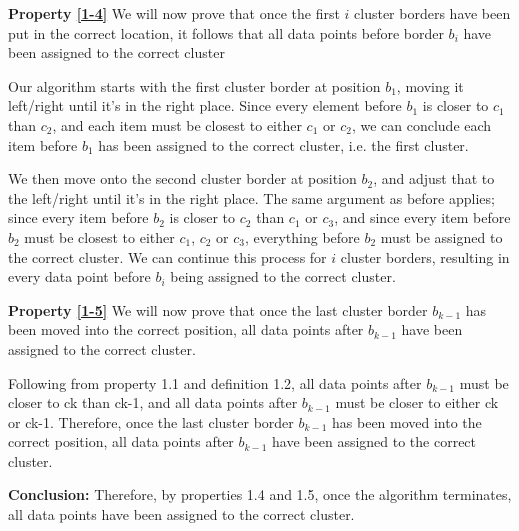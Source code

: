\documentclass[conference,compsoc]{IEEEtran}
\newtheorem{proofprp}{}
\newtheorem{subprp}{Property}[proofprp]
\begin{document}
\textbf{Property \ref{1-4}}
We will now prove that once the first $i$ cluster borders have been put in the correct location, it follows that all data points before border $b_i$ have been assigned to the correct cluster

Our algorithm starts with the first cluster border at position $b_1$, moving it left/right until it’s in the right place.
Since every element before $b_1$ is closer to $c_1$ than $c_2$, and each item must be closest to either $c_1$ or $c_2$,
we can conclude each item before $b_1$ has been assigned to the correct cluster, i.e. the first cluster.

We then move onto the second cluster border at position $b_2$, and adjust that to the left/right until it’s in the right place.
The same argument as before applies; since every item before $b_2$ is closer to $c_2$ than $c_1$ or $c_3$,
and since every item before $b_2$ must be closest to either $c_1$, $c_2$ or $c_3$, everything before $b_2$ must be assigned to the correct cluster.
We can continue this process for $i$ cluster borders, resulting in every data point before $b_i$ being assigned to the correct cluster.

\textbf{Property \ref{1-5}}
We will now prove that once the last cluster border $b_{k-1}$ has been moved into the correct position, all data points after $b_{k-1}$ have been assigned to the correct cluster.

Following from property 1.1 and definition 1.2, all data points after $b_{k-1}$ must be closer to ck than ck-1, and all data points after $b_{k-1}$ must be closer to either ck or ck-1. Therefore, once the last cluster border $b_{k-1}$ has been moved into the correct position, all data points after $b_{k-1}$ have been assigned to the correct cluster.

\textbf{Conclusion:}
Therefore, by properties 1.4 and 1.5, once the algorithm terminates, all data points have been assigned to the correct cluster.



        
\end{document}
